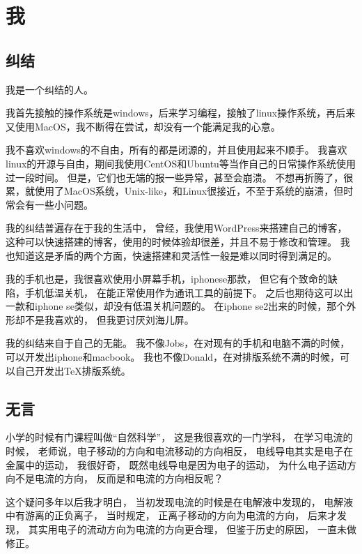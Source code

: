 
\chapter{我}

\section{纠结}


我是一个纠结的人。

我首先接触的操作系统是windows，后来学习编程，接触了linux操作系统，再后来又使用MacOS，我不断得在尝试，却没有一个能满足我的心意。

我不喜欢windows的不自由，所有的都是闭源的，并且使用起来不顺手。
我喜欢linux的开源与自由，期间我使用CentOS和Ubuntu等当作自己的日常操作系统使用过一段时间。
但是，它们也无端的报一些异常，甚至会崩溃。
不想再折腾了，很累，就使用了MacOS系统，Unix-like，和Linux很接近，不至于系统的崩溃，但时常会有一些小问题。


我的纠结普遍存在于我的生活中，
曾经，我使用WordPress来搭建自己的博客，
这种可以快速搭建的博客，使用的时候体验却很差，并且不易于修改和管理。
我也知道这是矛盾的两个方面，快速搭建和灵活性一般是难以同时得到满足的。

我的手机也是，我很喜欢使用小屏幕手机，iphonese那款，
但它有个致命的缺陷，手机低温关机，
在能正常使用作为通讯工具的前提下。
之后也期待这可以出一款和iphone se类似，却没有低温关机问题的。
在iphone se2出来的时候，那个外形却不是我喜欢的，
但我更讨厌刘海儿屏。


我的纠结来自于自己的无能。
我不像Jobs，在对现有的手机和电脑不满的时候，可以开发出iphone和macbook。
我也不像Donald，在对排版系统不满的时候，可以自己开发出TeX排版系统。





\section{无言}

小学的时候有门课程叫做“自然科学”，
这是我很喜欢的一门学科，
在学习电流的时候，
老师说，电子移动的方向和电流移动的方向相反，
电线导电其实是电子在金属中的运动，
我很好奇，
既然电线导电是因为电子的运动，
为什么电子运动方向不是电流的方向，
反而是和电流的方向相反呢？

这个疑问多年以后我才明白，
当初发现电流的时候是在电解液中发现的，
电解液中有游离的正负离子，
当时规定，
正离子移动的方向为电流的方向，
后来才发现，
其实用电子的流动方向为电流的方向更合理，
但鉴于历史的原因，
一直未做修正。


